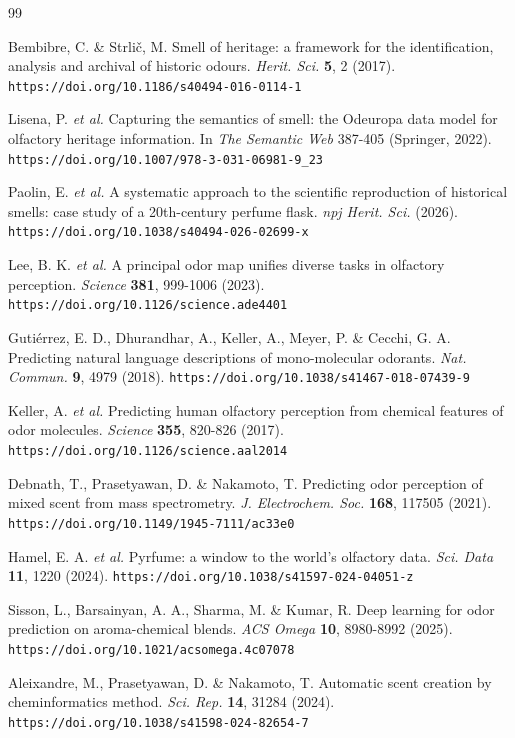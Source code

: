 \documentclass[12pt]{article}
\begin{document}
\begin{thebibliography}{99}

Bembibre, C. \& Strlič, M. Smell of heritage: a framework for the identification, analysis and archival of historic odours. \emph{Herit. Sci.} \textbf{5}, 2 (2017). \nolinkurl{https://doi.org/10.1186/s40494-016-0114-1}

Lisena, P. \emph{et al.} Capturing the semantics of smell: the Odeuropa data model for olfactory heritage information. In \emph{The Semantic Web} 387-405 (Springer, 2022). \nolinkurl{https://doi.org/10.1007/978-3-031-06981-9_23}

Paolin, E. \emph{et al.} A systematic approach to the scientific reproduction of historical smells: case study of a 20th-century perfume flask. \emph{npj Herit. Sci.} (2026). \nolinkurl{https://doi.org/10.1038/s40494-026-02699-x}

Lee, B. K. \emph{et al.} A principal odor map unifies diverse tasks in olfactory perception. \emph{Science} \textbf{381}, 999-1006 (2023). \nolinkurl{https://doi.org/10.1126/science.ade4401}

Gutiérrez, E. D., Dhurandhar, A., Keller, A., Meyer, P. \& Cecchi, G. A. Predicting natural language descriptions of mono-molecular odorants. \emph{Nat. Commun.} \textbf{9}, 4979 (2018). \nolinkurl{https://doi.org/10.1038/s41467-018-07439-9}

Keller, A. \emph{et al.} Predicting human olfactory perception from chemical features of odor molecules. \emph{Science} \textbf{355}, 820-826 (2017). \nolinkurl{https://doi.org/10.1126/science.aal2014}

Debnath, T., Prasetyawan, D. \& Nakamoto, T. Predicting odor perception of mixed scent from mass spectrometry. \emph{J. Electrochem. Soc.} \textbf{168}, 117505 (2021). \nolinkurl{https://doi.org/10.1149/1945-7111/ac33e0}

Hamel, E. A. \emph{et al.} Pyrfume: a window to the world's olfactory data. \emph{Sci. Data} \textbf{11}, 1220 (2024). \nolinkurl{https://doi.org/10.1038/s41597-024-04051-z}

Sisson, L., Barsainyan, A. A., Sharma, M. \& Kumar, R. Deep learning for odor prediction on aroma-chemical blends. \emph{ACS Omega} \textbf{10}, 8980-8992 (2025). \nolinkurl{https://doi.org/10.1021/acsomega.4c07078}

Aleixandre, M., Prasetyawan, D. \& Nakamoto, T. Automatic scent creation by cheminformatics method. \emph{Sci. Rep.} \textbf{14}, 31284 (2024). \nolinkurl{https://doi.org/10.1038/s41598-024-82654-7}


\end{thebibliography}
\end{document}
